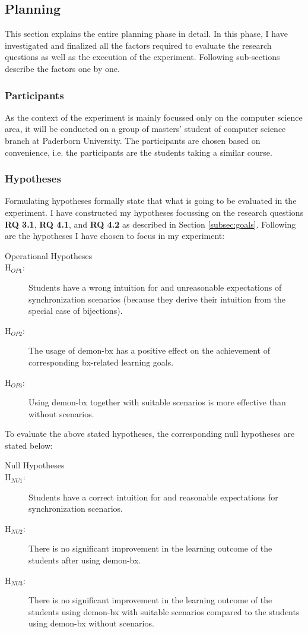 \subsection{Planning}\label{subsec:planning}
This section explains the entire planning phase in detail. In this phase, I have investigated and  finalized all the factors required to evaluate the research questions as well as the execution of the experiment. Following sub-sections describe the factors one by one.

\subsubsection{Participants}\label{subsubsec:participants}
As the context of the experiment is mainly focussed only on the computer science area, it will be conducted on a group of masters' student of computer science branch at Paderborn University. The participants are chosen based on convenience, i.e. the participants are the students taking a similar course.

\subsubsection{Hypotheses}\label{subsubsec:hypotheses}
Formulating hypotheses formally state that what is going to be evaluated in the experiment. I have constructed my hypotheses focussing on the research questions \textbf{RQ 3.1}, \textbf{RQ 4.1}, and  \textbf{RQ 4.2} as described in Section \ref{subsec:goals}. Following are the hypotheses I have chosen to focus in my experiment:\\

\begin{description}
	\item[Operational Hypotheses]
	\item[H$_{OP1}$:] Students have a wrong intuition for and unreasonable expectations of synchronization scenarios (because they derive their intuition from the special case of bijections).
	\item[H$_{OP2}$:] The usage of demon-bx has a positive effect on the achievement of corresponding bx-related learning goals.
	\item[H$_{OP3}$:] Using demon-bx together with suitable scenarios is more effective than without scenarios.
\end{description}

To evaluate the above stated hypotheses, the corresponding null hypotheses are stated below:
\begin{description}
	\item[Null Hypotheses]
	\item[H$_{NU1}$:] Students have a correct intuition for and reasonable expectations for synchronization scenarios.
	\item[H$_{NU2}$:] There is no significant improvement in the learning outcome of the students after using demon-bx.
	\item[H$_{NU3}$:] There is no significant improvement in the learning outcome of the students using demon-bx with suitable scenarios compared to the students using demon-bx without scenarios.

\end{description}

